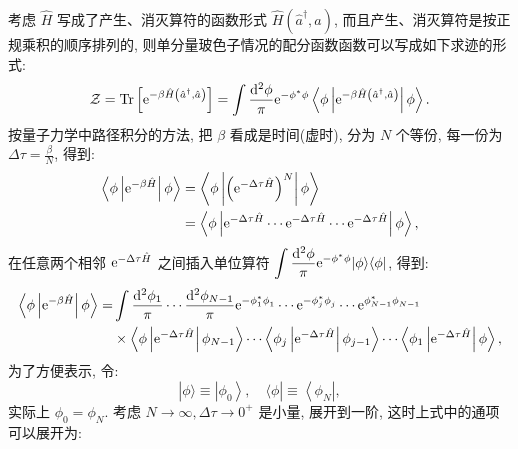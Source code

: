考虑 $\hat{H}$ 写成了产生、消灭算符的函数形式 $\hat{H}\left(\hat{a}^{\dagger}, \hat{a}\right)$, 而且产生、消灭算符是按正规乘积的顺序排列的, 则单分量玻色子情况的配分函数函数可以写成如下求迹的形式:
\begin{equation}
\mathcal{Z}=\operatorname{Tr}\left[\mathrm{e}^{-\beta \hat{H}\left(\hat{a}^{\dagger}, \hat{a}\right)}\right]=\int \frac{\mathrm{d}^{2} \phi}{\pi} \mathrm{e}^{-\phi^{*} \phi}\left\langle\phi\left|\mathrm{e}^{-\beta \hat{H}\left(\hat{a}^{\dagger}, \hat{a}\right)}\right| \phi\right\rangle.
\end{equation}
按量子力学中路径积分的方法, 把 $\beta$ 看成是时间(虚时), 分为 $N$ 个等份, 每一份为 $\displaystyle \Delta \tau=\frac{\beta}{N}$, 得到:
\begin{align}
\left\langle\phi\left|\mathrm{e}^{-\beta \hat{H}}\right| \phi\right\rangle &=\left\langle\phi\left|\left(\mathrm{e}^{-\Delta \tau \hat{H}}\right)^{N}\right| \phi\right\rangle \nonumber\\
&=\left\langle\phi\left|\mathrm{e}^{-\Delta \tau \hat{H}} \cdots \mathrm{e}^{-\Delta \tau \hat{H}} \cdots \mathrm{e}^{-\Delta \tau \hat{H}}\right| \phi\right\rangle,
\end{align}
在任意两个相邻 $\mathrm{e}^{-\Delta \tau \hat{H}}$ 之间插入单位算符 $\displaystyle\int \frac{\mathrm{d}^{2} \phi}{\pi} \mathrm{e}^{-\phi^{*} \phi}|\phi\rangle\langle\phi|$, 得到:
\begin{align}
\left\langle\phi\left|\mathrm{e}^{-\beta \hat{H}}\right| \phi\right\rangle=& \int \frac{\mathrm{d}^{2} \phi_{1}}{\pi} \cdots \frac{\mathrm{d}^{2} \phi_{N-1}}{\pi} \mathrm{e}^{-\phi_{1}^{*} \phi^{}_{1}} \cdots \mathrm{e}^{-\phi_{j}^{*} \phi^{}_{j}} \cdots \mathrm{e}^{\phi_{N-1}^{*} \phi^{}_{N-1}} \nonumber\\
&\times\left\langle\phi\left|\mathrm{e}^{-\Delta \tau \hat{H}}\right| \phi_{N-1}\right\rangle \cdots\left\langle\phi_{j}\left|\mathrm{e}^{-\Delta \tau \hat{H}}\right| \phi_{j-1}\right\rangle \cdots\left\langle\phi_{1}\left|\mathrm{e}^{-\Delta \tau \hat{H}}\right| \phi\right\rangle,
\end{align}
为了方便表示, 令:
\begin{equation}
|\phi\rangle \equiv\left|\phi_{0}\right\rangle, \quad\langle\phi| \equiv\left\langle\phi_{N}\right|,
\end{equation}
实际上 $\phi_{0}=\phi_{N}$. 考虑 $N \rightarrow \infty, \Delta\tau \rightarrow 0^{+}$ 是小量, 展开到一阶, 这时上式中的通项可以展开为:
